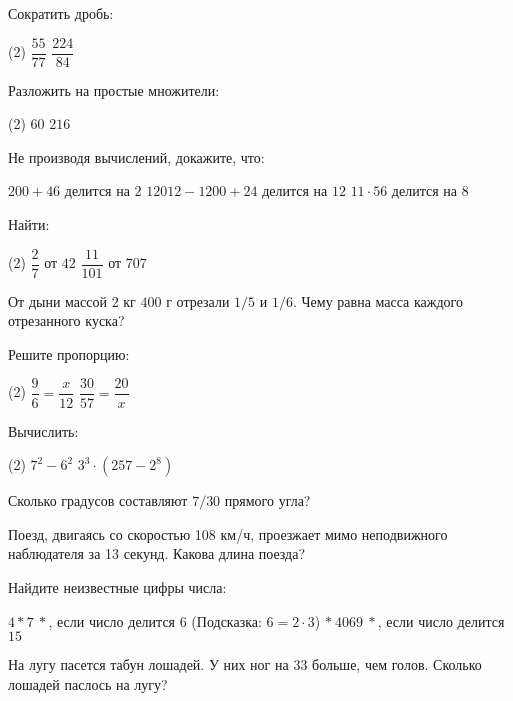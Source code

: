 \begin{exam}
	\begin{listofex}
	\item Сократить дробь:
	\begin{tasks}(2)
		\task \( \dfrac{55}{77} \)
		\task \( \dfrac{224}{84} \)
	\end{tasks}
	\item Разложить на простые множители:
	\begin{tasks}(2)
		\task \( 60 \)
		\task \( 216 \)
	\end{tasks}
	\item Не производя вычислений, докажите, что:
	\begin{tasks}
		\task \( 200+46 \) делится на \( 2 \)
		\task \( 12012-1200+24 \) делится на \( 12 \)
		\task \( 11\cdot56 \) делится на \( 8 \)
	\end{tasks}
	\item Найти:
	\begin{tasks}(2)
		\task \( \dfrac{2}{7} \) от \( 42 \)
		\task \( \dfrac{11}{101} \) от \( 707 \)
	\end{tasks}
	\item От дыни массой \( 2 \) кг \( 400 \) г отрезали \( 1/5 \) и \( 1/6 \). Чему равна масса каждого отрезанного куска?
	\item Решите пропорцию:
	\begin{tasks}(2)
		\task \( \dfrac{9}{6}=\dfrac{x}{12} \)
		\task \( \dfrac{30}{57}=\dfrac{20}{x} \)
	\end{tasks}
	\item Вычислить:
	\begin{tasks}(2)
		\task \( 7^2-6^2 \)
		\task \( 3^3\cdot(257-2^8) \)
	\end{tasks}
	\item Сколько градусов составляют \( 7/30 \) прямого угла?
	\item Поезд, двигаясь со скоростью 108 км/ч, проезжает мимо неподвижного наблюдателя за 13 секунд. Какова длина поезда?
	\item Найдите неизвестные цифры числа:
	\begin{tasks}
		\task \( 4*7\:* \), если число делится \( 6 \) (Подсказка: \( 6=2\cdot3 \))
		\task \( *\:4069\:* \), если число делится \( 15 \)
	\end{tasks}
	\item На лугу пасется табун лошадей. У них ног на \( 33 \) больше, чем голов. Сколько лошадей паслось на лугу?
	\end{listofex}
\end{exam}
